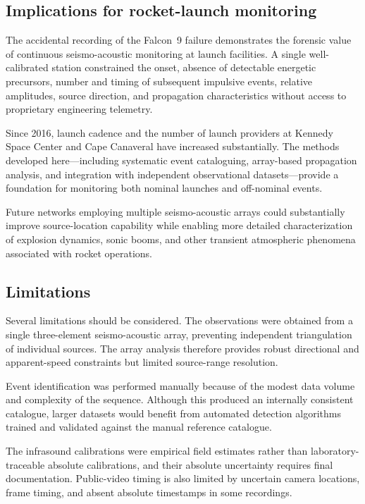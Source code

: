 \documentclass[]{seismica}
\begin{document}
\subsection{Implications for rocket-launch monitoring}
\label{sec:discussion_monitoring}

The accidental recording of the Falcon~9 failure demonstrates the forensic
value of continuous seismo-acoustic monitoring at launch facilities. A single
well-calibrated station constrained the onset, absence of detectable energetic
precursors, number and timing of subsequent impulsive events, relative
amplitudes, source direction, and propagation characteristics without access to
proprietary engineering telemetry.

Since 2016, launch cadence and the number of launch providers at Kennedy Space Center and Cape Canaveral have increased substantially. The methods developed here---including systematic event cataloguing, array-based propagation analysis, and integration with independent observational datasets---provide a foundation for monitoring both nominal launches and off-nominal events.

Future networks employing multiple seismo-acoustic arrays could substantially improve source-location capability while enabling more detailed characterization of explosion dynamics, sonic booms, and other transient atmospheric phenomena associated with rocket operations.

\subsection{Limitations}
\label{sec:discussion_limitations}

Several limitations should be considered. The observations were obtained from a single three-element seismo-acoustic array, preventing independent triangulation of individual sources. The array analysis therefore provides robust directional and apparent-speed constraints but limited source-range resolution.

Event identification was performed manually because of the modest data volume and complexity of the sequence. Although this produced an internally consistent catalogue, larger datasets would benefit from automated detection algorithms trained and validated against the manual reference catalogue.

The infrasound calibrations were empirical field estimates rather than
laboratory-traceable absolute calibrations, and their absolute uncertainty
requires final documentation. Public-video timing is also limited by uncertain
camera locations, frame timing, and absent absolute timestamps in some
recordings.
\end{document}
